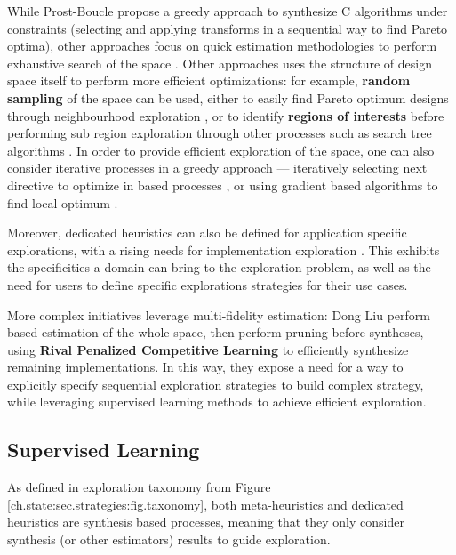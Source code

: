         While Prost-Boucle \etal{} \cite{prost-boucle_fast_2014} propose a greedy approach to synthesize C algorithms under constraints (selecting and applying transforms in a sequential way to find Pareto optima), other approaches focus on quick estimation methodologies to perform exhaustive search of the space \cite{zhong_design_2017}\cite{bannwart_perina_fast_2021}.
        Other approaches uses the structure of design space itself to perform more efficient optimizations: for example, {\bf random sampling} of the space can be used, either to easily find Pareto optimum designs through neighbourhood exploration \cite{ye_scalehls_2021}, or to identify {\bf regions of interests} before performing sub region exploration through other processes such as search tree algorithms \cite{awais_ldax_2021}.
        In order to provide efficient exploration of the space, one can also consider iterative processes in a greedy approach --- \eg iteratively selecting next directive to optimize in  based processes \cite{siracusa_comprehensive_2021}, or using gradient based algorithms to find local optimum \cite{witschen_circa_2019}.

\clearpage
        Moreover, dedicated heuristics can also be defined for application specific explorations, with a rising needs for  implementation exploration \cite{motamedi_design_2016}\cite{park_roofline-model-based_2020}.
        This exhibits the specificities a domain can bring to the exploration problem, as well as the need for users to define specific explorations strategies for their use cases.

        More complex initiatives leverage multi-fidelity estimation: Dong Liu \etal{} \cite{dong_liu_efficient_2016} perform  based estimation of the whole space, then perform pruning before syntheses, using {\bf Rival Penalized Competitive Learning} to efficiently synthesize remaining implementations.
        In this way, they expose a need for a way to explicitly specify sequential exploration strategies to build complex strategy, while leveraging supervised learning methods to achieve efficient exploration.

    \subsection{Supervised Learning}
    \label{ch.state:sec.strategies:ssec.ml}
        As defined in exploration taxonomy from Figure \ref{ch.state:sec.strategies:fig.taxonomy}, both meta-heuristics and dedicated heuristics are synthesis based processes, meaning that they only consider synthesis (or other estimators) results to guide exploration.

